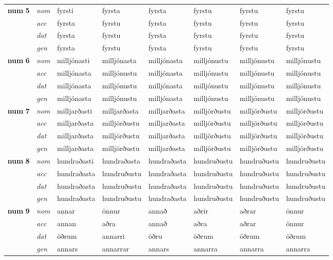 \begin{longtable}[l]{l>{\footnotesize\itshape}lXXXXXX}
\multirow{3}{*}{{{\textbf{num} \Large{\textbf{5}}}}}  &  nom & fyrsti & fyrsta    & fyrsta & fyrstu & fyrstu & fyrstu \\*
  & acc &  fyrsta  & fyrstu   & fyrsta & fyrstu & fyrstu & fyrstu \\*
&  dat & fyrsta & fyrstu   & fyrsta & fyrstu & fyrstu & fyrstu \\*
  & gen & fyrsta  & fyrstu  & fyrsta & fyrstu & fyrstu & fyrstu\\
\midrule

\multirow{3}{*}{{{\textbf{num} \Large{\textbf{6}}}}}  &  nom & milljónasti & milljónasta    & milljónasta & milljónustu & milljónustu & milljónustu \\*
  & acc &  milljónasta  & milljónustu   & milljónasta & milljónustu & milljónustu & milljónustu \\*
&  dat & milljónasta & milljónustu   & milljónasta & milljónustu & milljónustu & milljónustu \\*
  & gen & milljónasta  & milljónustu  & milljónasta & milljónustu & milljónustu & milljónustu\\
\midrule

\multirow{3}{*}{{{\textbf{num} \Large{\textbf{7}}}}}  &  nom & milljarðasti & milljarðasta    & milljarðasta & milljörðustu & milljörðustu & milljörðustu \\*
  & acc &  milljarðasta  & milljörðustu   & milljarðasta & milljörðustu & milljörðustu & milljörðustu \\*
&  dat & milljarðasta & milljörðustu   & milljarðasta & milljörðustu & milljörðustu & milljörðustu \\*
  & gen & milljarðasta  & milljörðustu  & milljarðasta & milljörðustu & milljörðustu & milljörðustu\\
\midrule

\multirow{3}{*}{{{\textbf{num} \Large{\textbf{8}}}}}  &  nom & hundraðasti & hundraðasta    & hundraðasta & hundruðustu & hundruðustu & hundruðustu \\*
  & acc &  hundraðasta  & hundruðustu   & hundraðasta & hundruðustu & hundruðustu & hundruðustu \\*
&  dat & hundraðasta & hundruðustu   & hundraðasta & hundruðustu & hundruðustu & hundruðustu \\*
  & gen & hundraðasta  & hundruðustu  & hundraðasta & hundruðustu & hundruðustu & hundruðustu\\
\midrule

\multirow{3}{*}{{{\textbf{num} \Large{\textbf{9}}}}}  &  nom & annar & önnur    & annað & aðrir & aðrar & önnur \\*
  & acc &  annan  & aðra   & annað & aðra & aðrar & önnur \\*
&  dat & öðrum & annarri   & öðru & öðrum & öðrum & öðrum \\*
  & gen & annars  & annarrar  & annars & annarra & annarra & annarra\\
\bottomrule
\end{longtable}
